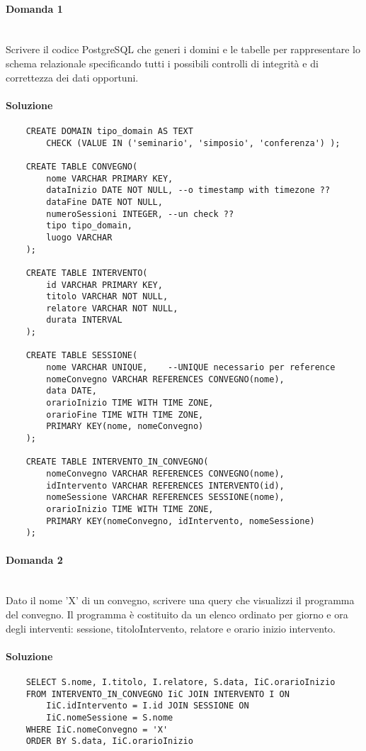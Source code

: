 \documentclass[a4paper, 10pt, titlepage]{article}
\begin{document}
\paragraph{Domanda 1}\dotfill
\\Scrivere il codice PostgreSQL che generi i domini e le tabelle per rappresentare lo schema relazionale specificando tutti i possibili controlli di integrità e di correttezza dei dati opportuni.

\paragraph{Soluzione}\dotfill
\begin{lstlisting}
	CREATE DOMAIN tipo_domain AS TEXT
		CHECK (VALUE IN ('seminario', 'simposio', 'conferenza') );
		
	CREATE TABLE CONVEGNO(
		nome VARCHAR PRIMARY KEY,
		dataInizio DATE NOT NULL, --o timestamp with timezone ??
		dataFine DATE NOT NULL,
		numeroSessioni INTEGER,	--un check ??
		tipo tipo_domain,
		luogo VARCHAR
	);
	
	CREATE TABLE INTERVENTO(
		id VARCHAR PRIMARY KEY,
		titolo VARCHAR NOT NULL,
		relatore VARCHAR NOT NULL,
		durata INTERVAL
	);
	
	CREATE TABLE SESSIONE(
		nome VARCHAR UNIQUE,	--UNIQUE necessario per reference
		nomeConvegno VARCHAR REFERENCES CONVEGNO(nome),
		data DATE,
		orarioInizio TIME WITH TIME ZONE,
		orarioFine TIME WITH TIME ZONE,
		PRIMARY KEY(nome, nomeConvegno)
	);
	
	CREATE TABLE INTERVENTO_IN_CONVEGNO(
		nomeConvegno VARCHAR REFERENCES CONVEGNO(nome),
		idIntervento VARCHAR REFERENCES INTERVENTO(id),
		nomeSessione VARCHAR REFERENCES SESSIONE(nome),
		orarioInizio TIME WITH TIME ZONE,
		PRIMARY KEY(nomeConvegno, idIntervento, nomeSessione)
	);

\end{lstlisting}

\paragraph{Domanda 2}\dotfill
\\Dato il nome 'X' di un convegno, scrivere una query che visualizzi il programma del convegno. Il programma è costituito da un elenco ordinato per giorno e ora degli interventi: sessione, titoloIntervento, relatore e orario inizio intervento.

\paragraph{Soluzione}\dotfill
\begin{lstlisting}
	SELECT S.nome, I.titolo, I.relatore, S.data, IiC.orarioInizio
	FROM INTERVENTO_IN_CONVEGNO IiC JOIN INTERVENTO I ON
		IiC.idIntervento = I.id JOIN SESSIONE ON
		IiC.nomeSessione = S.nome
	WHERE IiC.nomeConvegno = 'X'
	ORDER BY S.data, IiC.orarioInizio
\end{lstlisting}
\end{document}
